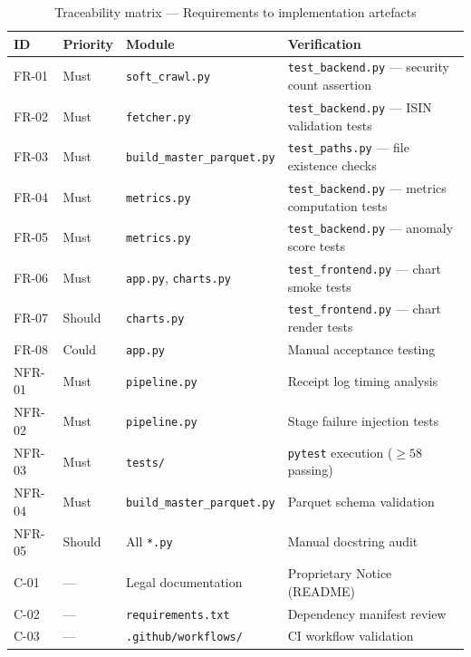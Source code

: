 \documentclass[
  11pt,
  a4paper,
  twoside,
  openany
]{report}
\begin{document}
\begin{table}[H]
\centering
\caption{Traceability matrix — Requirements to implementation artefacts}
\label{tab:traceability}
\small
\begin{tabularx}{\textwidth}{l l l X}
\toprule
\textbf{ID} & \textbf{Priority} & \textbf{Module} & \textbf{Verification} \\
\midrule
FR-01 & Must   & \texttt{soft\_crawl.py}             & \texttt{test\_backend.py} — security count assertion \\
FR-02 & Must   & \texttt{fetcher.py}                 & \texttt{test\_backend.py} — ISIN validation tests \\
FR-03 & Must   & \texttt{build\_master\_parquet.py}   & \texttt{test\_paths.py} — file existence checks \\
FR-04 & Must   & \texttt{metrics.py}                  & \texttt{test\_backend.py} — metrics computation tests \\
FR-05 & Must   & \texttt{metrics.py}                  & \texttt{test\_backend.py} — anomaly score tests \\
FR-06 & Must   & \texttt{app.py}, \texttt{charts.py}  & \texttt{test\_frontend.py} — chart smoke tests \\
FR-07 & Should & \texttt{charts.py}                   & \texttt{test\_frontend.py} — chart render tests \\
FR-08 & Could  & \texttt{app.py}                      & Manual acceptance testing \\
\midrule
NFR-01 & Must  & \texttt{pipeline.py}                 & Receipt log timing analysis \\
NFR-02 & Must  & \texttt{pipeline.py}                 & Stage failure injection tests \\
NFR-03 & Must  & \texttt{tests/}                      & \texttt{pytest} execution ($\geq 58$ passing) \\
NFR-04 & Must  & \texttt{build\_master\_parquet.py}    & Parquet schema validation \\
NFR-05 & Should & All \texttt{*.py}                    & Manual docstring audit \\
\midrule
C-01  & —      & Legal documentation                   & Proprietary Notice (README) \\
C-02  & —      & \texttt{requirements.txt}             & Dependency manifest review \\
C-03  & —      & \texttt{.github/workflows/}           & CI workflow validation \\
\bottomrule
\end{tabularx}
\end{table}
\end{document}
